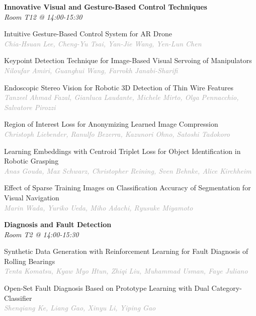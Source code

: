 \begin{multicols*}{2}
\normalsize \textbf{Innovative Visual and Gesture-Based Control Techniques}\\
\small \textit{Room T12 @ 14:00-15:30}

\small Intuitive Gesture-Based Control System for AR Drone\\ 
\footnotesize \textcolor{darkgray}{\textit{Chia-Hsuan Lee, Cheng-Yu  Tsai, Yan-Jie  Wang, Yen-Lun  Chen}}

\small Keypoint Detection Technique for Image-Based Visual Servoing of Manipulators\\ 
\footnotesize \textcolor{darkgray}{\textit{Niloufar Amiri, Guanghui  Wang, Farrokh  Janabi-Sharifi}}

\small Endoscopic Stereo Vision for Robotic 3D Detection of Thin Wire Features\\ 
\footnotesize \textcolor{darkgray}{\textit{Tanzeel Ahmad Fazal, Gianluca  Laudante, Michele  Mirto, Olga  Pennacchio, Salvatore  Pirozzi}}

\small Region of Interest Loss for Anonymizing Learned Image Compression\\ 
\footnotesize \textcolor{darkgray}{\textit{Christoph Liebender, Ranulfo  Bezerra, Kazunori  Ohno, Satoshi  Tadokoro}}

\small Learning Embeddings with Centroid Triplet Loss for Object Identification in Robotic Grasping\\ 
\footnotesize \textcolor{darkgray}{\textit{Anas Gouda, Max  Schwarz, Christopher  Reining, Sven  Behnke, Alice  Kirchheim}}

\small Effect of Sparse Training Images on Classification Accuracy of Segmentation for Visual Navigation\\ 
\footnotesize \textcolor{darkgray}{\textit{Marin Wada, Yuriko  Ueda, Miho  Adachi, Ryusuke  Miyamoto}}

\normalsize \textbf{Diagnosis and Fault Detection}\\
\small \textit{Room T2 @ 14:00-15:30}

\small Synthetic Data Generation with Reinforcement Learning for Fault Diagnosis of Rolling Bearings\\ 
\footnotesize \textcolor{darkgray}{\textit{Tenta Komatsu, Kyaw Myo  Htun, Zhiqi  Liu, Muhammad  Usman, Faye  Juliano}}

\small Open-Set Fault Diagnosis Based on Prototype Learning with Dual Category-Classifier\\ 
\footnotesize \textcolor{darkgray}{\textit{Shenqiang Ke, Liang  Gao, Xinyu  Li, Yiping  Gao}}


\end{multicols*}
